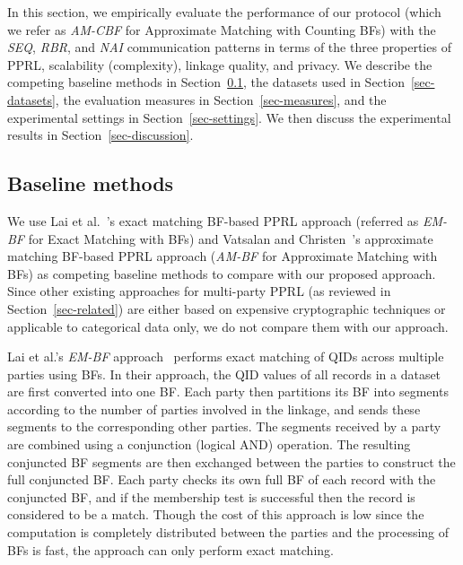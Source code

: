 \documentclass{sig-alternate}
\begin{document}
In this section, we empirically evaluate 
the performance of
our protocol (which we refer as \emph{AM-CBF} for
Approximate Matching with Counting BFs) 
with the \emph{SEQ}, \emph{RBR}, and \emph{NAI}
communication patterns
in terms of the three properties of PPRL,
scalability (complexity), linkage quality, and
privacy. 
We describe the competing baseline methods 
in Section~\ref{sec-competing-methods},
the datasets used in Section~\ref{sec-datasets},
the evaluation measures in Section~\ref{sec-measures},
and the experimental settings in Section~\ref{sec-settings}.
We then discuss the experimental
results in Section~\ref{sec-discussion}.


\subsection{Baseline methods}
\label{sec-competing-methods}

We use Lai et al.~\cite{Lai06}'s exact matching 
BF-based PPRL
approach (referred as \emph{EM-BF} for Exact Matching
with BFs) and Vatsalan and Christen~\cite{Vat14c,Vat16c}'s
approximate matching BF-based PPRL approach 
(\emph{AM-BF} for Approximate Matching with BFs) as competing
baseline methods to compare with our proposed approach.
Since other existing approaches for multi-party PPRL
(as reviewed in Section~\ref{sec-related})
are either based on expensive cryptographic techniques
or applicable to
categorical data only, we do not compare them with
our approach.

Lai et al.'s \emph{EM-BF} approach~\cite{Lai06} performs exact matching
of QIDs across multiple parties using BFs.
In their approach, the QID values of all records in a dataset
are first converted into one BF. 
Each party then partitions its BF into segments
according to the number of parties involved in the linkage, and sends
these segments to the corresponding other parties. The segments received by a party
are combined using a conjunction (logical AND) operation. The
resulting conjuncted BF segments are then exchanged between
the parties to construct the full conjuncted BF. 
Each party checks its own full BF of each record with the
conjuncted BF, and if the membership test is successful then the record
is considered to be a match. Though the cost of this approach is low
since the computation is completely distributed between the parties
and the processing of BFs is fast, the
approach can only perform exact matching. 
\end{document}
